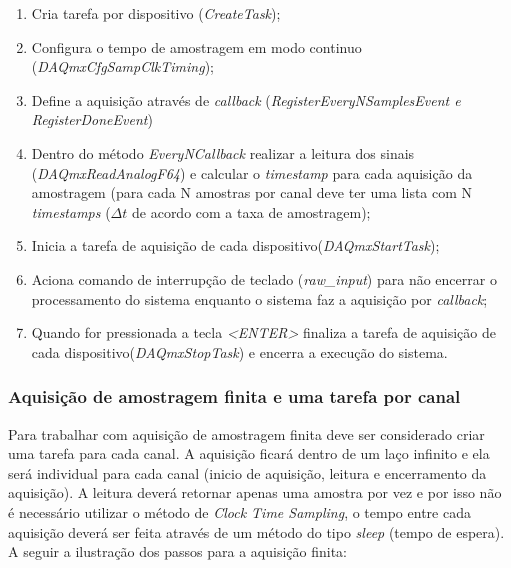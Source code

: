 \documentclass{ufscThesis}
\begin{document}
\begin{enumerate}
  \item Cria tarefa por dispositivo (\textit{CreateTask});
  \item Configura o tempo de amostragem em modo continuo (\textit{DAQmxCfgSampClkTiming});
  \item Define a aquisição através de \textit{callback} (\textit{RegisterEveryNSamplesEvent e RegisterDoneEvent})
  \item Dentro do método \textit{EveryNCallback} realizar a leitura dos sinais (\textit{DAQmxReadAnalogF64}) e calcular o \textit{timestamp} para cada aquisição da amostragem (para cada N amostras por canal deve ter uma lista com N \textit{timestamps} ($\Delta t$ de acordo com a taxa de amostragem);
  \item Inicia a tarefa de aquisição de cada dispositivo(\textit{DAQmxStartTask});
  \item Aciona comando de interrupção de teclado (\textit{raw\_input}) para não encerrar o processamento do sistema enquanto o sistema faz a aquisição por \textit{callback};
  \item Quando for pressionada a tecla \textit{<ENTER>} finaliza a tarefa de aquisição de cada dispositivo(\textit{DAQmxStopTask}) e encerra a execução do sistema.
\end{enumerate}

\subsubsection{Aquisição de amostragem finita e uma tarefa por canal}\label{aquisicao-finita-loop-infinito}

Para trabalhar com aquisição de amostragem finita deve ser considerado criar uma tarefa para cada canal. A aquisição ficará dentro de um laço infinito e ela será individual para cada canal (inicio de aquisição, leitura e encerramento da aquisição). A leitura deverá retornar apenas uma amostra por vez e por isso não é necessário utilizar o método de \textit{Clock Time Sampling}, o tempo entre cada aquisição deverá ser feita através de um método do tipo \textit{sleep} (tempo de espera). A seguir a ilustração dos passos para a aquisição finita:
\end{document}
